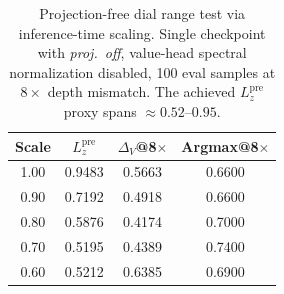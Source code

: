 \begin{table}[t]
\caption{Projection-free dial range test via inference-time scaling.
Single checkpoint with \emph{proj.\ off}, value-head spectral normalization disabled, 100 eval samples at $8\times$ depth mismatch.
The achieved $L^{\mathrm{pre}}_z$ proxy spans $\approx 0.52$--$0.95$.}
\label{tab:exp4_projection_free_dial}
\centering
\small
\begin{tabular}{@{}cccc@{}}
\toprule
Scale & $L^{\mathrm{pre}}_z$ & $\Delta_V$@8$\times$ & Argmax@8$\times$ \\
\midrule
1.00 & 0.9483 & 0.5663 & 0.6600 \\
0.90 & 0.7192 & 0.4918 & 0.6600 \\
0.80 & 0.5876 & 0.4174 & 0.7000 \\
0.70 & 0.5195 & 0.4389 & 0.7400 \\
0.60 & 0.5212 & 0.6385 & 0.6900 \\
\bottomrule
\end{tabular}
\end{table}
